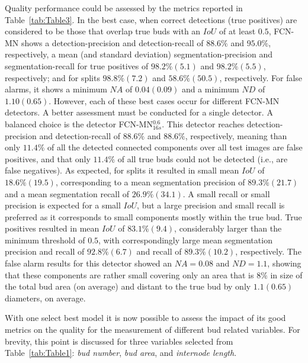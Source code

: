 \documentclass[a4paper,authoryear,review]{elsarticle}
\begin{document}
	Quality performance could be assessed by the metrics reported in Table~\ref{tab:Table3}. In the best case, when correct detections (true positives) are considered to be those that overlap true buds with an $IoU$ of at least $0.5$, FCN-MN shows a detection-precision and detection-recall of $88.6\%$ and $95.0\%$, respectively, a mean (and standard deviation) segmentation-precision and segmentation-recall for true positives of $98.2\%(5.1)$ and $98.2\%(5.5)$, respectively; and for splits $98.8\%(7.2)$ and $58.6\%(50.5)$, respectively. For false alarms, it shows a minimum $NA$ of $0.04(0.09)$ and a minimum $ND$ of $1.10(0.65)$. 
	However, each of these best cases occur for different FCN-MN detectors. A better assessment must be conducted for a single detector. A balanced choice is the detector FCN-MN$_{16s}^{0.6}$. This detector reaches detection-precision and detection-recall of $88.6\%$ and $88.6\%$, respectively, meaning than only $11.4\%$ of all the detected connected components over all test images are false positives, and that only $11.4\%$ of all true buds could not be detected (i.e., are false negatives).
	As expected, for splits it resulted in small mean $IoU$ of $18.6\%(19.5)$, corresponding to a mean segmentation precision of $89.3\%(21.7)$ and a mean segmentation recall of $26.9\%(34.1)$. A small recall or small precision is expected for a small $IoU$, but a large precision and small recall is preferred as it corresponds to small components mostly within the true bud. True positives resulted in mean $IoU$ of $83.1\%(9.4)$, considerably larger than the minimum threshold of $0.5$, with correspondingly large mean segmentation precision and recall of $92.8\%(6.7)$ and recall of $89.3\%(10.2)$, respectively. 
	The false alarm results for this detector showed an $NA=0.08$ and $ND=1.1$, showing that these components are rather small covering only an area that is $8\%$ in size of the total bud area (on average) and distant to the true bud by only $1.1 (0.65)$ diameters, on average.
	
	
	With one select best model it is now possible to  assess the impact of its good metrics on the quality for the measurement of different bud related variables. For brevity, this point is discussed for three variables selected from Table~\ref{tab:Table1}: \emph{bud number}, \emph{bud area}, and \emph{internode length}.
	
\end{document}
